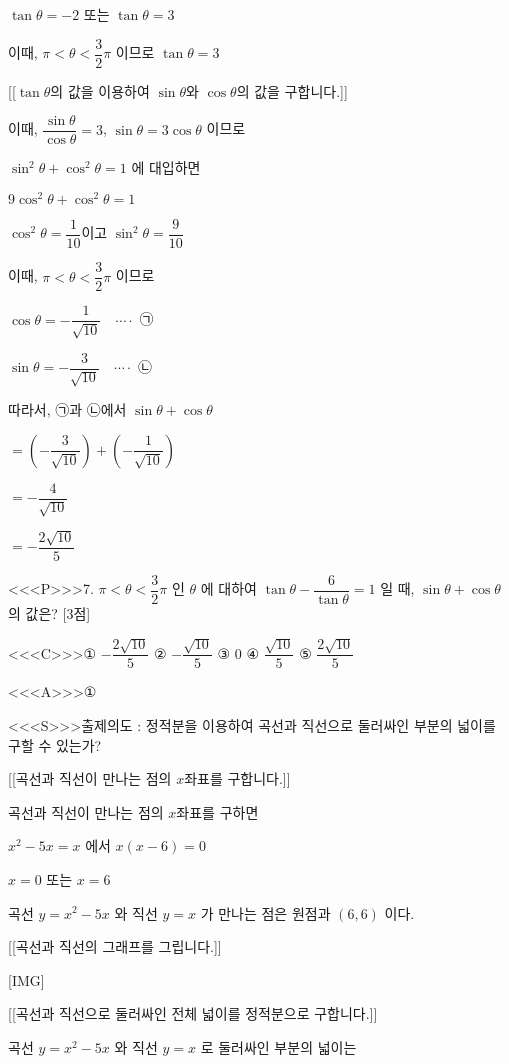 \documentclass{oblivoir}
\begin{document}
$\tan \theta=-2$ 또는 $\tan \theta=3$

이때, $\pi< \theta< \dfrac{3}{2} \pi$ 이므로
$\tan \theta=3$

[[$\tan \theta$의 값을 이용하여 $\sin \theta$와 $\cos \theta$의 값을 구합니다.]]

이때,
$\dfrac{\sin \theta}{\cos \theta}=3$,
$\sin \theta=3 \cos \theta$
이므로

$\sin ^{2} \theta+\cos ^{2} \theta=1$ 에 대입하면

$9 \cos ^{2} \theta+\cos ^{2} \theta=1$

$ \cos ^{2} \theta=\dfrac{1}{10}$이고 $ \sin ^{2} \theta=\dfrac{9}{10}$

이때, $\pi< \theta< \dfrac{3}{2} \pi$ 이므로

$\cos \theta=-\dfrac{1}{\sqrt{10}} \quad \cdots \cdot$ ㉠

$\sin \theta=-\dfrac{3}{\sqrt{10}} \quad \cdots \cdot$ ㉡

따라서, ㉠과 ㉡에서 $\sin \theta+\cos \theta$

$=\left(-\dfrac{3}{\sqrt{10}}\right)+\left(-\dfrac{1}{\sqrt{10}}\right)$

$=-\dfrac{4}{\sqrt{10}}$

$=-\dfrac{2 \sqrt{10}}{5}$



<<<P>>>7. $\pi< \theta< \dfrac{3}{2} \pi$ 인 $\theta$ 에 대하여 $\tan \theta-\dfrac{6}{\tan \theta}=1$ 일 때, $\sin \theta+\cos \theta$ 의 값은? [3점]

<<<C>>>① $-\dfrac{2 \sqrt{10}}{5}$
② $-\dfrac{\sqrt{10}}{5}$
③ $0$
④ $\dfrac{\sqrt{10}}{5}$
⑤ $\dfrac{2 \sqrt{10}}{5}$


<<<A>>>①

<<<S>>>출제의도 : 정적분을 이용하여 곡선과 직선으로 둘러싸인 부분의 넓이를 구할 수 있는가?

[[곡선과 직선이 만나는 점의 $x$좌표를 구합니다.]]

곡선과 직선이 만나는 점의 $x$좌표를 구하면 

$x^{2}-5 x=x$ 에서 $x(x-6)=0$

$x=0$ 또는 $x=6$

곡선 $y=x^{2}-5 x$ 와 직선 $y=x$ 가 만나는 점은 원점과 $(6,6)$ 이다.

[[곡선과 직선의 그래프를 그립니다.]]

[IMG]

[[곡선과 직선으로 둘러싸인 전체 넓이를 정적분으로 구합니다.]]

곡선 $y=x^{2}-5 x$ 와 직선 $y=x$ 로 둘러싸인 부분의 넓이는
\end{document}
